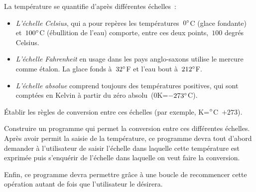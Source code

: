 \begin{exercice}
  La temp\'erature se quantifie d'apr\`es diff\'erentes \'echelles~:
  \begin{itemize}
  \item  \textit{L'\'echelle   Celsius},  qui a   pour   rep\`eres les
    temp\'eratures~$0^{\circ}$C   (glace fondante)     et~$100^{\circ}$C
    (\'ebullition  de l'eau) comporte,   entre ces  deux points,~$100$
    degr\'es Celsius.
  \item \textit{L'\'echelle  Fahrenheit}   en   usage dans  les   pays
    anglo-saxons utilise le mercure comme   \'etalon. La glace   fonds
    \`a~$32^{\circ}$F et l'eau bout \`a~$212^{\circ}$F.
  \item  \textit{L'\'echelle    absolue} comprend       toujours   des
    temp\'eratures positives, qui sont compt\'ees en Kelvin \`a partir
    du z\'ero absolu~($0$K=$-273^{\circ}$C).
  \end{itemize} 
  \'Etablir  les r\`egles   de  conversion entre ces  \'echelles  (par
  exemple, K=$^{\circ}$C~$+273$).
  \par
  Construire  un  programme   qui   permet  la  conversion  entre  ces
  diff\'erentes \'echelles.  Apr\`es  avoir   permit la saisie  de  la
  temp\'erature, ce   programme  devra   tout  d'abord  demander   \`a
  l'utilisateur  de    saisir   l'\'echelle   dans     laquelle  cette
  temp\'erature est  exprim\'ee puis  s'enqu\'erir de  l'\'echelle dans
  laquelle on veut faire la conversion.
  \par
  Enfin,  ce programme  devra  permettre gr\^ace  \`a  une   boucle de
  recommencer cette op\'eration   autant de fois que  l'utilisateur le
  d\'esirera.
  \ifcorrection
  \begin{correction}
    
  \end{correction}
  \fi
\end{exercice}